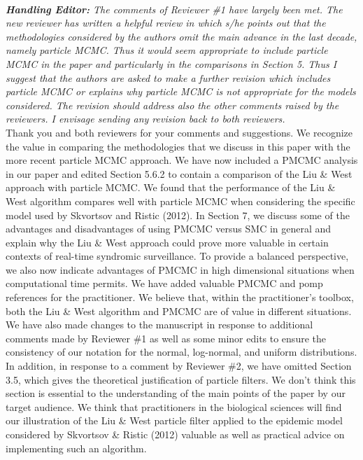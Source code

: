 \documentclass{article}
\begin{document}
 \\

\noindent \emph{{\bf Handling Editor:} The comments of Reviewer \#1 have largely been met.  The new reviewer has written a helpful review in which s/he points out that the methodologies considered by the authors omit the main advance in the last decade, namely particle MCMC.  Thus it would seem appropriate to include particle MCMC in the paper and particularly in the comparisons in Section 5.  Thus I suggest that the authors are asked to make a further revision which includes particle MCMC or explains why particle MCMC is not appropriate for the models considered.  The revision should address also the other comments raised by the reviewers.  I envisage sending any revision back to both reviewers.} \\

Thank you and both reviewers for your comments and suggestions. We recognize the value in comparing the methodologies that we discuss in this paper with the more recent particle MCMC approach. We have now included a PMCMC analysis in our paper and edited Section 5.6.2 to contain a comparison of the Liu \& West approach with particle MCMC. We found that the performance of the Liu \& West algorithm compares well with particle MCMC when considering the specific model used by Skvortsov and Ristic (2012). In Section 7, we discuss some of the advantages and disadvantages of using PMCMC versus SMC in general and explain why the Liu \& West approach could prove more valuable in certain contexts of real-time syndromic surveillance. To provide a balanced perspective, we also now indicate advantages of PMCMC in high dimensional situations when computational time permits. We have added valuable PMCMC and pomp references for the practitioner. We believe that, within the practitioner's toolbox, both the Liu \& West algorithm and PMCMC are of value in different situations. \\

We have also made changes to the manuscript in response to additional comments made by Reviewer \#1 as well as some minor edits to ensure the consistency of our notation for the normal, log-normal, and uniform distributions. In addition, in response to a comment by Reviewer \#2, we have omitted Section 3.5, which gives the theoretical justification of particle filters. We don't think this section is essential to the understanding of the main points of the paper by our target audience. We think that practitioners in the biological sciences will find our illustration of the Liu \& West particle filter applied to the epidemic model considered by Skvortsov \& Ristic (2012) valuable as well as practical advice on implementing such an algorithm. \\
\end{document}
